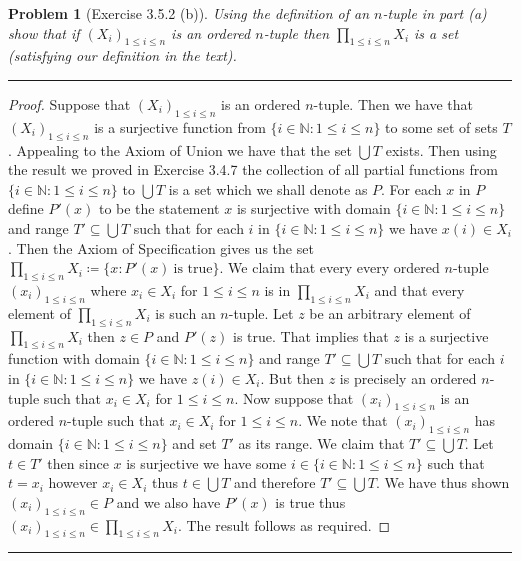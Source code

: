 \documentclass{article}
\newcommand{\lined}{\noindent\rule{\textwidth}{1pt}}
\newtheorem*{problem}{Problem}
\begin{document}
	\newpage
	
	\begin{problem}[Exercise 3.5.2 (b)]
		Using the definition of an $n$-tuple in part (a) show that if $(X_i)_{1 \leq i \leq n}$ is an ordered $n$-tuple then 
		$\prod_{1 \leq i \leq n} X_i$ is a set (satisfying our definition in the text).
	\end{problem}
	
	\lined
	\begin{proof}
		Suppose that $(X_i)_{1 \leq i \leq n}$ is an ordered $n$-tuple. Then we have that $(X_i)_{1 \leq i \leq n}$ is a surjective function
		from $\{i \in \mathbb{N}:1\leq i \leq n\}$ to some set of sets $T$. Appealing to the Axiom of Union we have that the set 
		$\bigcup T$ exists. Then using the result we proved in Exercise 3.4.7 the collection of all partial functions from $\{i \in \mathbb{N}:1\leq i \leq n\}$ to $\bigcup T$ is a set which we shall denote as $P$. For each $x$ in $P$ define $P'(x)$ to be the statement $x$ is surjective with domain $\{i \in \mathbb{N}:1\leq i \leq n\}$ and range $T' \subseteq \bigcup T$ such that for each $i$ in $\{i \in \mathbb{N}:1\leq i \leq n\}$ we have $x(i) \in X_i$. Then the Axiom of Specification gives us the set 
		$\prod_{1 \leq i \leq n} X_i \coloneqq \{x:P'(x)\ \text{is true}\}$. We claim that every every ordered $n$-tuple $(x_i)_{1 \leq i \leq n}$
		where $x_i \in X_i$ for $1 \leq i \leq n$ is in $\prod_{1 \leq i \leq n} X_i$ and that every element of $\prod_{1 \leq i \leq n} X_i$ is such an $n$-tuple. Let $z$ be an arbitrary element of $\prod_{1 \leq i \leq n} X_i$ then $z \in P$ and $P'(z)$ is true. That implies that $z$ is a surjective function with domain $\{i \in \mathbb{N}:1\leq i \leq n\}$ and range $T' \subseteq \bigcup T$ such that for each $i$ in $\{i \in \mathbb{N}:1\leq i \leq n\}$ we have $z(i) \in X_i$. But then $z$ is precisely an ordered $n$-tuple such that 
		$x_i \in X_i$ for $1 \leq i \leq n$. Now suppose that $(x_i)_{1 \leq i \leq n}$ is an ordered $n$-tuple such that $x_i \in X_i$ for $1 \leq i \leq n$. We note that $(x_i)_{1 \leq i \leq n}$ has domain $\{i \in \mathbb{N}:1\leq i \leq n\}$ and set $T'$ as its range. We claim that $T' \subseteq \bigcup T$. Let $t \in T'$ then since $x$ is surjective we have some $i \in \{i \in \mathbb{N}:1\leq i \leq n\}$
		such that $t = x_i$ however $x_i \in X_i$ thus $t \in \bigcup T$ and therefore $T' \subseteq \bigcup T$. We have thus shown $(x_i)_{1 \leq i \leq n} \in P$ and we also have $P'(x)$ is true thus $(x_i)_{1 \leq i \leq n} \in \prod_{1 \leq i \leq n} X_i$. The result follows as required.
	\end{proof}
	\lined
\end{document}
